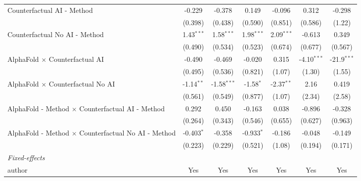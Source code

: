 \begin{tabular}{lcccccc}
   Counterfactual AI - Method                                 & -0.229        & -0.378        & 0.149        & -0.096       & 0.312         & -0.298\\   
                                                              & (0.398)       & (0.438)       & (0.590)      & (0.851)      & (0.586)       & (1.22)\\   
   Counterfactual No AI - Method                              & 1.43$^{***}$  & 1.58$^{***}$  & 1.98$^{***}$ & 2.09$^{***}$ & -0.613        & 0.349\\   
                                                              & (0.490)       & (0.534)       & (0.523)      & (0.674)      & (0.677)       & (0.567)\\   
   AlphaFold $\times$ Counterfactual AI                       & -0.490        & -0.469        & -0.020       & 0.315        & -4.10$^{***}$ & -21.9$^{***}$\\   
                                                              & (0.495)       & (0.536)       & (0.821)      & (1.07)       & (1.30)        & (1.55)\\   
   AlphaFold $\times$ Counterfactual No AI                    & -1.14$^{**}$  & -1.58$^{***}$ & -1.58$^{*}$  & -2.37$^{**}$ & 2.16          & 0.419\\   
                                                              & (0.561)       & (0.549)       & (0.877)      & (1.07)       & (2.34)        & (2.58)\\   
   AlphaFold - Method $\times$ Counterfactual AI - Method     & 0.292         & 0.450         & -0.163       & 0.038        & -0.896        & -0.328\\   
                                                              & (0.264)       & (0.343)       & (0.546)      & (0.655)      & (0.627)       & (0.963)\\   
   AlphaFold - Method $\times$ Counterfactual No AI - Method  & -0.403$^{*}$  & -0.358        & -0.933$^{*}$ & -0.186       & -0.048        & -0.149\\   
                                                              & (0.223)       & (0.229)       & (0.521)      & (1.08)       & (0.194)       & (0.171)\\   
   \midrule
   \emph{Fixed-effects}\\
   author                                                     & Yes           & Yes           & Yes          & Yes          & Yes           & Yes\\  

\end{tabular}
